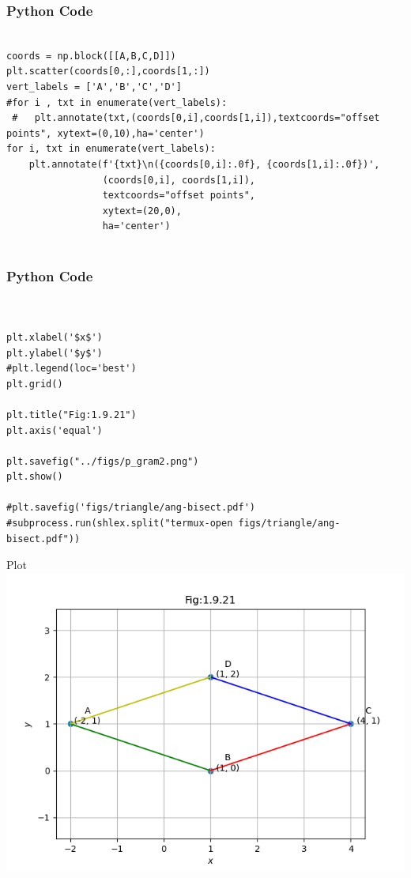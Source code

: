 \documentclass{beamer}
\begin{document}
\begin{frame}[fragile]
    \frametitle{Python Code }
    \begin{lstlisting}

coords = np.block([[A,B,C,D]])
plt.scatter(coords[0,:],coords[1,:])
vert_labels = ['A','B','C','D']
#for i , txt in enumerate(vert_labels):
 #   plt.annotate(txt,(coords[0,i],coords[1,i]),textcoords="offset points", xytext=(0,10),ha='center')
for i, txt in enumerate(vert_labels):
    plt.annotate(f'{txt}\n({coords[0,i]:.0f}, {coords[1,i]:.0f})',
                 (coords[0,i], coords[1,i]),
                 textcoords="offset points",
                 xytext=(20,0),
                 ha='center')


    \end{lstlisting}
\end{frame}
\begin{frame}[fragile]
    \frametitle{Python Code }
    \begin{lstlisting}

    
plt.xlabel('$x$')
plt.ylabel('$y$')
#plt.legend(loc='best')
plt.grid()

plt.title("Fig:1.9.21")
plt.axis('equal')

plt.savefig("../figs/p_gram2.png")
plt.show()

#plt.savefig('figs/triangle/ang-bisect.pdf')
#subprocess.run(shlex.split("termux-open figs/triangle/ang-bisect.pdf"))

    \end{lstlisting}
\end{frame}


\begin{frame}{Plot}
    \centering
    \includegraphics[width=\columnwidth, height=0.8\textheight, keepaspectratio]{figs/p_gram1.png}   
\end{frame}
\end{document}

